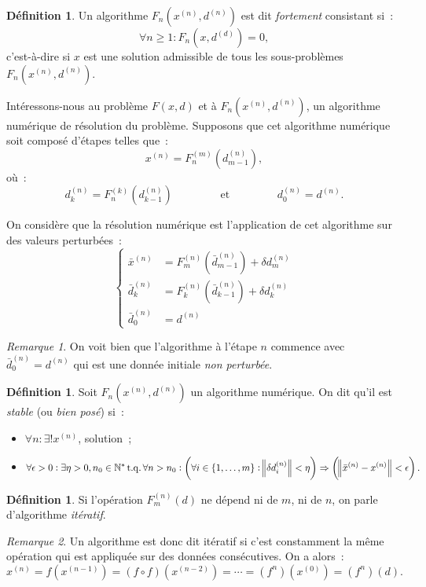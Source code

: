 \documentclass{article}
\theoremstyle{definition}
\newtheorem{déf}[thm]{Définition}
\theoremstyle{remark}
\newtheorem*{rmq}{Remarque}
\DeclareMathOperator{\tq}{t.q.}  %
\newcommand{\N}{\mathbb N}
\newcommand{\algonum}[3]{F_{#1}(#2^{(#1)}, #3^{(#1)})}
\newcommand{\algnum}{\algonum nxd}
\begin{document}
	\begin{déf} Un algorithme $\algnum$ est dit \emph{fortement} consistant si~:
	\[\forall n \geq 1 : F_n(x, d^{(d)}) = 0,\]
	c'est-à-dire si $x$ est une solution admissible de tous les sous-problèmes $\algnum$.
	\end{déf}

	Intéressons-nous au problème $F(x, d)$ et à $\algnum$, un algorithme numérique de résolution du problème. Supposons que cet algorithme numérique soit composé
	d'étapes telles que~:
	\[x^{(n)} = F_n^{(m)}\left(d_{m-1}^{(n)}\right),\]
	où~:
	\[d_{k}^{(n)} = F_n^{(k)}\left(d_{k-1}^{(n)}\right)\qquad\qquad\text{ et }\qquad\qquad d_0^{(n)} = d^{(n)}.\]

	On considère que la résolution numérique est l'application de cet algorithme sur des valeurs perturbées~:
	\[\begin{cases}
		\bar x^{(n)} &= F_m^{(n)}\left(\bar d_{m-1}^{(n)}\right) + \delta d_m^{(n)} \\
		\bar d_k^{(n)} &= F_{k}^{(n)}\left(\bar d_{k-1}^{(n)}\right) + \delta d_k^{(n)} \\
		\bar d_0^{(n)} &= d^{(n)}
	\end{cases}\]

	\begin{rmq} On voit bien que l'algorithme à l'étape $n$ commence avec $\bar d_0^{(n)} = d^{(n)}$ qui est une donnée initiale \emph{non perturbée}. \end{rmq}

	\begin{déf} Soit $\algnum$ un algorithme numérique. On dit qu'il est \emph{stable} (ou \emph{bien posé}) si~:
	\begin{itemize}
		\item $\forall n : \exists! x^{(n)}$, solution~;
		\item \[\forall \epsilon > 0 : \exists \eta > 0, n_0 \in \N^* \tq \forall n > n_0 :
			\left(\forall i \in \{1, \dotsc, m\} : \norm {\delta d_i^{(n)}} < \eta\right) \Rightarrow \left(\norm {\bar x^{(n)}-x^{(n)}} < \epsilon\right).\]
	\end{itemize}
	\end{déf}

	\begin{déf} Si l'opération $F_m^{(n)}(d)$ ne dépend ni de $m$, ni de $n$, on parle d'algorithme \emph{itératif}. \end{déf}

	\begin{rmq} Un algorithme est donc dit itératif si c'est constamment la même opération qui est appliquée sur des données consécutives. On a alors~:
	\[x^{(n)} = f(x^{(n-1)}) = (f \circ f)(x^{(n-2)}) = \dotsb = \left(f^n\right)(x^{(0)}) = \left(f^n\right)(d).\]
	\end{rmq}
\end{document}
